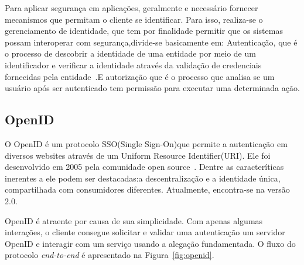 Para aplicar segurança em aplicações, geralmente e necessário fornecer mecanismos que permitam o cliente se identificar. Para isso, realiza-se o gerenciamento de identidade, que tem por finalidade permitir que os sistemas possam interoperar com segurança,divide-se basicamente em: Autenticação, que é o processo de descobrir a identidade de uma entidade por meio de um identificador e verificar a identidade através da validação de credenciais fornecidas pela entidade~\cite{lakshmiraghavan2013pro}.E autorização que é o processo que analisa se um usuário após ser autenticado tem permissão para executar uma determinada ação.%



\subsection{OpenID}

O OpenID é um protocolo SSO(Single Sign-On)que permite a autenticação em diversos websites através de um Uniform Resource Identifier(URI). Ele foi desenvolvido em 2005 pela comunidade open source~\cite{Recordon2006}. Dentre as caracteríticas inerentes a ele podem ser destacadas:a descentralização e a identidade única, compartilhada com consumidores diferentes. Atualmente, encontra-se na versão 2.0.

OpenID é atraente por causa de sua simplicidade. Com apenas algumas interações, o cliente consegue solicitar e validar  uma autenticação um servidor OpenID e interagir com um serviço usando a alegação fundamentada. O fluxo do protocolo \emph{end-to-end} é apresentado na Figura~\ref{fig:openid}.

